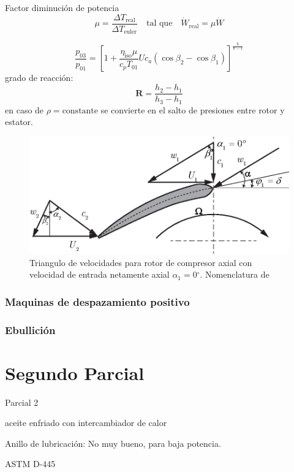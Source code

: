 \documentclass{article}
\newcommand{\substy}[2]{\ensuremath{{#1_{\mathrm{#2}}}}}
\newcommand{\degree}{\ensuremath{{^\circ}}}
\newcommand{\cp}{c_p}
\newcommand{\gasconst}{k}
\newcommand{\ctegas}{\gasconst}
\newcommand{\cax}[1]{\ensuremath{c_{a #1}}}
\newcommand{\cte}{\textrm{constante}}
\newcommand{\etaiso}{\eta_{\mathrm{iso}}}
\newcommand{\dW}{\dot{W}}
\newcommand{\powerreduction}{\mu}
\newcommand{\degreeofreaction}{{\bm{R}}}
\begin{document}
Factor diminución de potencia
\[
\powerreduction = \frac{\Delta \substy{T}{real}}{\Delta \substy{T}{euler}} \quad \text{tal que} \quad \substy{\dW}{real} = \powerreduction \dW
\]

\[
\frac{p_{03}}{p_{01}} = \left[1 + \frac{\etaiso \powerreduction}{\cp T_{01}}U \cax{} (\cos \beta_2 - \cos \beta_1) \right]^{\frac{\ctegas}{\ctegas-1}}
\]
grado de reacción:
\[
\degreeofreaction = \frac{h_2 - h_1}{h_3 - h_1}
\]
en caso de $\rho = \cte$ se convierte en el salto de presiones entre rotor y estator.
\begin{figure}[htb!]
    \centering
    \includegraphics{fig/pumpVelTriangle.eps}
    \caption{Triangulo de velocidades para rotor de compresor axial con velocidad de entrada netamente axial $\alpha_1 = 0\degree$. Nomenclatura de \cite{book:TurboDick} }
    \label{fig:velocitytrianglepump}
\end{figure}

\section{Maquinas de despazamiento positivo}





\section{Ebullición}

\part{Segundo Parcial}

Parcial 2

aceite enfriado con intercambiador de calor

Anillo de lubricación: No muy bueno, para baja potencia.

ASTM D-445
\end{document}
